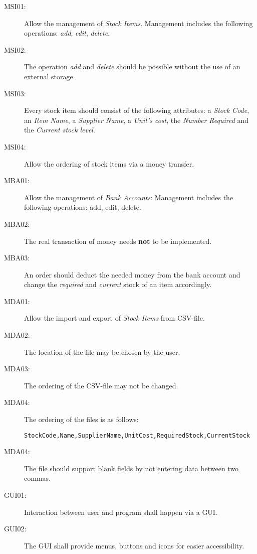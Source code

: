 \begin{description}
\item[MSI01:] Allow the management of \textit{Stock Items}. Management includes the following operations: \textit{add}, \textit{edit}, \textit{delete}.
\item[MSI02:] The operation \textit{add} and \textit{delete} should be possible without the use of an external storage.
\item[MSI03:] Every stock item should consist of the following attributes: a \textit{Stock Code}, an \textit{Item Name}, a \textit{Supplier Name}, a \textit{Unit's cost}, the \textit{Number Required} and the \textit{Current stock level}.
\item[MSI04:] Allow the ordering of stock items via a money transfer.
\item[MBA01:] Allow the management of \textit{Bank Accounts}: Management includes the following operations: add, edit, delete.
\item[MBA02:] The real transaction of money needs \textbf{not} to be implemented.
\item[MBA03:] An order should deduct the needed money from the bank account and change the \textit{required} and \textit{current} stock of an item accordingly.
\item[MDA01:] Allow the import and export of \textit{Stock Items} from \ac{CSV}-file.
\item[MDA02:] The location of the file may be chosen by the user.
\item[MDA03:] The ordering of the \ac{CSV}-file may not be changed.
\item[MDA04:] The ordering of the files is as follows:
\begin{lstlisting}
StockCode,Name,SupplierName,UnitCost,RequiredStock,CurrentStock
\end{lstlisting}
\item[MDA04:] The file should support blank fields by not entering data between two commas.
\item[GUI01:] Interaction between user and program shall happen via a \ac{GUI}.
\item[GUI02:] The \ac{GUI} shall provide menus, buttons and icons for easier accessibility.
\end{description}
